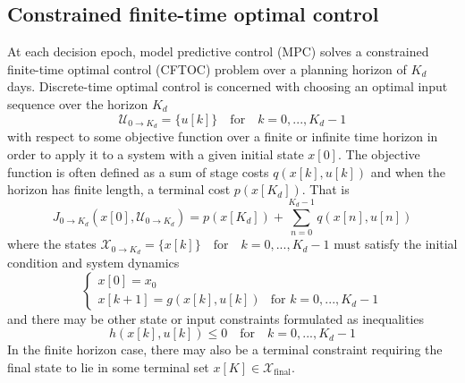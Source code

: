 \documentclass[preprint,12pt]{elsarticle}
\begin{document}
\subsection{Constrained finite-time optimal control}\label{subsec:cftoc}

At each decision epoch, model predictive control (MPC) solves a constrained finite-time optimal control (CFTOC) problem over a planning horizon of $K_{d}$ days. Discrete-time optimal control is concerned with choosing an optimal input sequence over the horizon $K_{d}$
\begin{equation}
\mathcal{U}_{0\to K_{d}} = \{ u[k] \} \quad \text{for} \quad k=0,...,K_{d}-1
\label{eqn:U0K}
\end{equation}
with respect to some objective function over a finite or infinite time horizon in order to apply it to a system with a given initial state $x[0]$. The objective function is often defined as a sum of stage costs $q(x[k], u[k])$ and when the horizon has finite length, a terminal cost $p(x[K_{d}])$. That is
\begin{equation}
J_{0\to K_{d}}(x[0], \mathcal{U}_{0\to K_{d}}) = p(x[K_{d}]) + \sum_{n=0}^{K_{d}-1} q(x[n], u[n])
\label{eqn:gen-opt-ctrl-cost}
\end{equation}
where the states $\mathcal{X}_{0\to K_{d}} = \{ x[k] \} \quad \text{for} \quad k=0,...,K_{d}-1$ must satisfy the initial condition and system dynamics
\begin{equation}
\begin{cases}
x[0] = x_{0} \\
x[k+1] = g(x[k], u[k]) & \text{for } k=0,...,K_{d}-1
\end{cases}
\label{eqn:dyn-constraint}
\end{equation}
and there may be other state or input constraints formulated as inequalities
\begin{equation}
h(x[k], u[k]) \leq 0 \quad \text{for} \quad k=0,...,K_{d}-1
\label{eqn:ineq-constraints}
\end{equation}
In the finite horizon case, there may also be a terminal constraint requiring the final state to lie in some terminal set $x[K]\in\mathcal{X}_{\text{final}}$.
\end{document}
